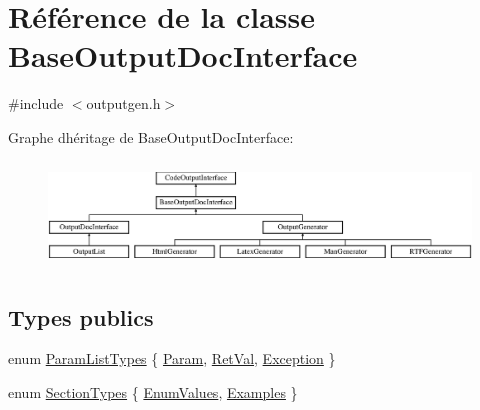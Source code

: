 \hypertarget{class_base_output_doc_interface}{}\section{Référence de la classe Base\+Output\+Doc\+Interface}
\label{class_base_output_doc_interface}


{\ttfamily \#include $<$outputgen.\+h$>$}

Graphe d\textquotesingle{}héritage de Base\+Output\+Doc\+Interface\+:\begin{figure}[H]
\begin{center}
\leavevmode
\includegraphics[height=2.835443cm]{class_base_output_doc_interface}
\end{center}
\end{figure}
\subsection*{Types publics}
\begin{DoxyCompactItemize}
\item 
enum \hyperlink{class_base_output_doc_interface_a944ed4d9fb389999c2724eeb321b8c8c}{Param\+List\+Types} \{ \hyperlink{class_base_output_doc_interface_a944ed4d9fb389999c2724eeb321b8c8ca2f12909be9be736f564ef1bccd8bc981}{Param}, 
\hyperlink{class_base_output_doc_interface_a944ed4d9fb389999c2724eeb321b8c8ca7dbac297ebba84b706efa2afb8e5e609}{Ret\+Val}, 
\hyperlink{class_base_output_doc_interface_a944ed4d9fb389999c2724eeb321b8c8ca013f47562e6f852189ce39404b2c83ce}{Exception}
 \}
\item 
enum \hyperlink{class_base_output_doc_interface_a07a3d5df76a714674e070e5e236fe886}{Section\+Types} \{ \hyperlink{class_base_output_doc_interface_a07a3d5df76a714674e070e5e236fe886a14899d1909b84ceff4b564f2c5cdd5c8}{Enum\+Values}, 
\hyperlink{class_base_output_doc_interface_a07a3d5df76a714674e070e5e236fe886a8e76c29b11f7bc42235f145253d37661}{Examples}
 \}
\end{DoxyCompactItemize}
